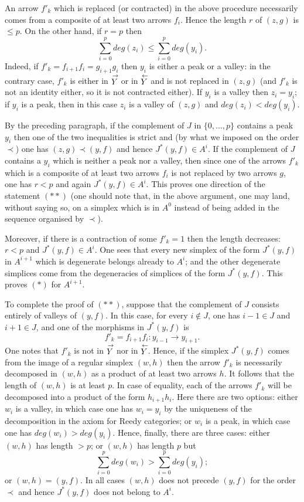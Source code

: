 An arrow $f'_k$ which is replaced (or contracted) in the
above procedure necessarily comes from a composite of at least two arrows
$f_i$. Hence the length $r$ of $(z,g)$ is $\leq p$. On the other hand, if $r=p$
then
$$
\sum _{i=0}^p deg (z_i) \leq \sum _{i=0}^p deg (y_i).
$$
Indeed, if $f'_k=f_{i+1}f_i = g_{i+1}g_i$ then $y_i$ is either a peak
or a valley: in the contrary case, $f'_k$ is either in
$\stackrel{\rightarrow}{Y}$
or in $\stackrel{\leftarrow}{Y}$ and is not replaced in $(z,g)$ (and $f'_k$
is not an identity either, so it is not contracted either).
If $y_i$ is a valley then $z_i=y_i$; if $y_i$ is a peak, then in this case
$z_i$ is a valley of $(z,g)$ and $deg(z_i) < deg (y_i)$.

By the preceding paragraph, if the complement of $J$ in $\{
0,\ldots , p\}$ contains a peak $y_i$ then one of the two
inequalities is strict and (by what we imposed on the order
$\prec$) one has $(z,g)\prec (y,f)$ and hence $J^{\ast}(y,f)\in A^i$. If the
complement
of $J$ contains a $y_i$ which is neither a peak nor a valley, then since one of
the arrows $f'_k$ which is a composite of at least two arrows $f_i$ is
not replaced by two arrows $g$, one has $r<p$ and again
$J^{\ast}(y,f)\in A^i$.
This proves one direction of the statement $(\ast \ast )$
(one should note that, in the above argument, one may land, without saying so,
on a
simplex which is in $A^0$ instead of being added in the sequence organised
by $\prec$).


Moreover, if there is a contraction of some $f'_k= 1$ then the length
decreases: $ r<p$ and $J^{\ast}(y,f)\in A^i$. One sees that every new
simplex
of the form $J^{\ast}(y,f)$ in $A^{i+1}$ which is degenerate belongs
already to $A^{i}$; and the other degenerate simplices
come from the degeneracies of simplices of the form
$J^{\ast}(y,f)$. This proves $(\ast )$ for $A^{i+1}$.

To complete the proof of $(\ast \ast )$, suppose that the complement
of $J$ consists entirely of valleys of $(y,f)$. In this case, for every
$i\not \in J$, one has $i-1\in J$ and $i+1\in J$, and one of the morphisms in
$J^{\ast}(y,f)$ is
$$
f'_k=f_{i+1}f_i: y_{i-1}\rightarrow y_{i+1}.
$$
One notes that $f'_k$ is not in $\stackrel{\rightarrow}{Y}$ nor in $\stackrel{\leftarrow}{Y}$.
Hence, if the simplex $J^{\ast}(y,f)$ comes from the image of a regular
simplex
$(w,h)$ then the arrow $f'_k$ is necessarily decomposed in $(w,h)$
as a product of at least two arrows $h$. It follows that the length of
$(w,h)$
is at least $p$. In case of equality, each of the arrows $f'_k$ will be
decomposed into a product of the form $h_{i+1} h_i$. Here there are two
options: either $w_i$ is a valley, in which case one has $w_i=y_i$ by
the uniqueness of
the decomposition in the axiom for Reedy categories; or $w_i$ is
a peak, in which case one has $deg (w_i)> deg(y_i)$. Hence, finally, there are
three cases:
either $(w,h)$ has length $>p$; or $(w,h)$ has length $p$ but
$$
\sum _{i=0}^p deg(w_i)>  \sum _{i=0}^p deg(y_i);
$$
or $(w,h)=(y,f)$. In all cases $(w,h)$ does not precede $(y,f)$ for
the order $\prec$ and hence $J^{\ast}(y,f)$ does not belong to $A^i$.

